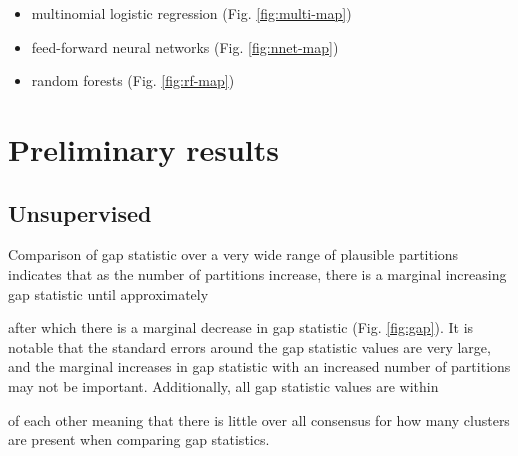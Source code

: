 \documentclass{article}\usepackage{graphicx, color}
\makeatletter
\newenvironment{kframe}{%
 \def\at@end@of@kframe{}%
 \ifinner\ifhmode%
  \def\at@end@of@kframe{\end{minipage}}%
  \begin{minipage}{\columnwidth}%
 \fi\fi%
 \def\FrameCommand##1{\hskip\@totalleftmargin \hskip-\fboxsep
 \colorbox{shadecolor}{##1}\hskip-\fboxsep
     \hskip-\linewidth \hskip-\@totalleftmargin \hskip\columnwidth}%
 \MakeFramed {\advance\hsize-\width
   \@totalleftmargin\z@ \linewidth\hsize
   \@setminipage}}%
 {\par\unskip\endMakeFramed%
 \at@end@of@kframe}
\newenvironment{knitrout}{}{} %
\makeatother
\begin{document}
\begin{itemize}
  \item multinomial logistic regression (Fig. \ref{fig:multi-map})
  \item feed-forward neural networks (Fig. \ref{fig:nnet-map})
  \item random forests (Fig. \ref{fig:rf-map})
\end{itemize}


\section{Preliminary results}
\subsection{Unsupervised}
Comparison of gap statistic over a very wide range of plausible partitions indicates that as the number of partitions increase, there is a marginal increasing gap statistic until approximately 

{\ttfamily\noindent\bfseries\color{errorcolor}{\\Error in eval(expr, envir, enclos) : object 'tmorph.km' not found}} after which there is a marginal decrease in gap statistic (Fig. \ref{fig:gap}). It is notable that the standard errors around the gap statistic values are very large, and the marginal increases in gap statistic with an increased number of partitions may not be important. Additionally, all gap statistic values are within 

{\ttfamily\noindent\bfseries\color{errorcolor}{\\Error in eval(expr, envir, enclos) : object 'tmorph.gap' not found}} of each other meaning that there is little over all consensus for how many clusters are present when comparing gap statistics.

\begin{knitrout}
\color{fgcolor}\begin{kframe}


{\ttfamily\noindent\bfseries\color{errorcolor}{\#\# Error: object 'tmorph.gap' not found}}

{\ttfamily\noindent\bfseries\color{errorcolor}{\#\# Error: object 'gg.gap' not found}}\end{kframe}
\end{knitrout}
\end{document}
